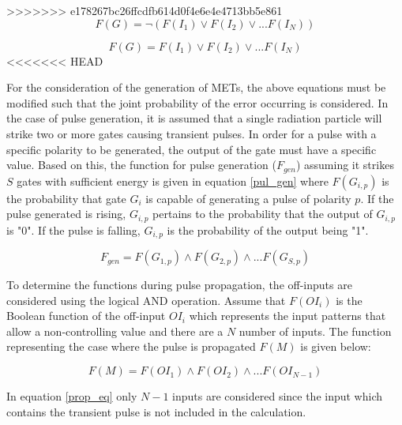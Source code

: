 \documentclass[conference]{IEEEtran}
\begin{document}
\small
>>>>>>> e178267bc26ffcdfb614d0f4e6e4e4713bb5e861
\begin{equation} \label{OR_RISING}
F(G) = \lnot (F(I_1) \lor F(I_2) \lor ... F(I_N))
\end{equation}

\begin{equation} \label{OR_FALLING}
F(G) = F(I_1) \lor F(I_2) \lor ... F(I_N)
\end{equation}
<<<<<<< HEAD

For the consideration of the generation of METs, the above equations must be modified such that the joint probability of the error occurring is considered. In the case of pulse generation, it is assumed that a single radiation particle will strike two or more gates causing transient pulses. In order for a pulse with a specific polarity to be generated, the output of the gate must have a specific value. Based on this, the function for pulse generation ($F_{gen}$) assuming it strikes $S$ gates with sufficient energy is given in equation \ref{pul_gen} where $F(G_{i,p})$ is the probability that gate $G_i$ is capable of generating a pulse of polarity $p$. If the pulse generated is rising, $G_{i,p}$ pertains to the probability that the output of $G_{i,p}$ is "0". If the pulse is falling, $G_{i,p}$ is the probability of the output being "1".

\begin{equation} \label{pul_gen}
F_{gen} = F(G_{1, p}) \land F(G_{2, p}) \land ... F(G_{S, p})
\end{equation}

To determine the functions during pulse propagation, the off-inputs are considered using the logical AND operation. Assume that $F(OI_i)$ is the Boolean function of the off-input $OI_i$ which represents the input patterns that allow a non-controlling value and there are a $N$ number of inputs. The function representing the case where the pulse is propagated $F(M)$ is given below:

\begin{equation} \label{prop_eq}
F(M) = F(OI_1) \land F(OI_2) \land ... F(OI_{N-1})
\end{equation}

In equation \ref{prop_eq} only $N-1$ inputs are considered since the input which contains the transient pulse is not included in the calculation. 
\end{document}
